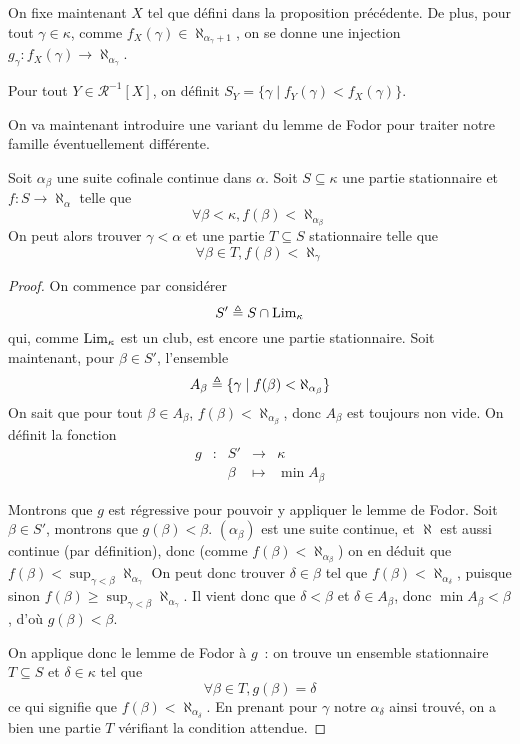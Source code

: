 \begin{notation}
  On fixe maintenant $X$ tel que défini dans la proposition précédente. De plus,
  pour tout $\gamma \in \kappa$, comme
  $f_X(\gamma) \in \aleph_{\alpha_\gamma + 1}$, on se donne une injection
  $g_\gamma : f_X(\gamma) \to \aleph_{\alpha_\gamma}$.

  Pour tout $Y\in\mathcal R^{-1}[X]$, on définit
  $S_Y = \{\gamma\mid f_Y(\gamma) < f_X(\gamma)\}$.
\end{notation}

On va maintenant introduire une variant du lemme de Fodor pour traiter notre
famille éventuellement différente.

\begin{lemma}
  Soit $\alpha_\beta$ une suite cofinale continue dans $\alpha$. Soit
  $S\subseteq\kappa$ une partie stationnaire et $f : S \to \aleph_\alpha$ telle
  que
  \[\forall \beta < \kappa, f(\beta) < \aleph_{\alpha_\beta}\]
  On peut alors trouver $\gamma < \alpha$ et une partie $T\subseteq S$
  stationnaire telle que
  \[\forall \beta \in T, f(\beta) < \aleph_\gamma\]
\end{lemma}

\begin{proof}
  On commence par considérer
  \[S' \triangleq S \cap \operatorname{Lim}_\kappa\]
  qui, comme $\operatorname{Lim}_\kappa$ est un club, est encore une partie stationnaire.
  Soit maintenant, pour $\beta \in S'$, l'ensemble
  \[A_\beta \triangleq \{\gamma \mid f(\beta) < \aleph_{\alpha_\beta}\}\]
  On sait que pour tout $\beta \in A_\beta$, $f(\beta) < \aleph_{\alpha_\beta}$,
  donc $A_\beta$ est toujours non vide. On définit la fonction
  \[\begin{array}{ccccc}
  g & : & S' & \longrightarrow & \kappa\\
  & & \beta & \longmapsto & \min A_\beta
  \end{array}\]

  Montrons que $g$ est régressive pour pouvoir y appliquer le lemme de Fodor.
  Soit $\beta \in S'$, montrons que $g(\beta) < \beta$. $(\alpha_\beta)$ est
  une suite continue, et $\aleph$ est aussi continue (par définition), donc
  (comme $f(\beta) < \aleph_{\alpha_\beta}$) on en déduit que
  $f(\beta) < \sup_{\gamma < \beta} \aleph_{\alpha_\gamma}$
  On peut donc trouver $\delta \in \beta$ tel que
  $f(\beta) < \aleph_{\alpha_\delta}$, puisque sinon
  $f(\beta) \geq \sup_{\gamma < \beta} \aleph_{\alpha_\gamma}$.
  Il vient donc que $\delta < \beta$ et $\delta \in A_\beta$, donc
  $\min A_\beta < \beta$, d'où $g(\beta) < \beta$.

  On applique donc le lemme de Fodor à $g$~: on trouve un ensemble stationnaire
  $T\subseteq S$ et $\delta \in \kappa$ tel que
  \[\forall \beta \in T, g(\beta) = \delta\]
  ce qui signifie que $f(\beta) < \aleph_{\alpha_\delta}$. En prenant pour
  $\gamma$ notre $\alpha_\delta$ ainsi trouvé, on a bien une partie $T$
  vérifiant la condition attendue.
\end{proof}

